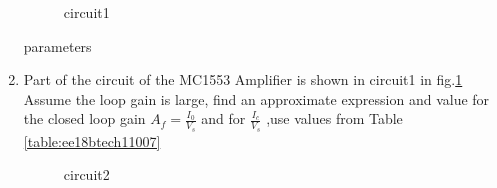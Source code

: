 \begin{enumerate}[label=\thesubsection.\arabic*.,ref=\thesubsection.\theenumi]

\begin{figure}[!ht]
	\begin{center}
		
		\resizebox{\columnwidth}{!}{}
	\end{center}
\caption{circuit1}
\label{fig:circuit1}
\end{figure}
\begin{table}[!ht]
\centering

\caption{parameters}
\label{table:ee18btech11007}
\end{table}
\item Part of the circuit of the MC1553 Amplifier is shown in circuit1 in  fig.\ref{fig:circuit1} Assume the loop gain is large, find an approximate expression and value for the closed loop gain $A_f=\frac{I_0}{V_s}$ and  for $\frac{I_c}{V_s}$ ,use values from Table \ref{table:ee18btech11007}
\begin{figure}[!ht]
	\begin{center}
		
		\resizebox{\columnwidth}{!}{}
	\end{center}
\caption{circuit2}
\label{fig:circuit2}
\end{figure}


\end{enumerate}
